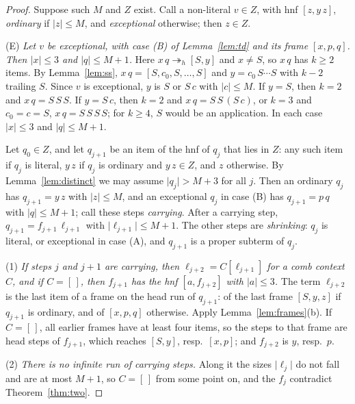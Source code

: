 \documentclass[11pt]{amsart}
\newcommand{\hred}{\twoheadrightarrow_h}
\newcommand{\sz}[1]{\lvert#1\rvert}
\newcommand{\fr}[1]{[#1]}
\begin{document}
\begin{proof}
Suppose such $M$ and $Z$ exist. Call a non-literal $v\in Z$, with hnf $\fr{z,y\,z}$, \emph{ordinary} if
$\sz z\le M$, and \emph{exceptional} otherwise; then $z\in Z$.

(E) \emph{Let $v$ be exceptional, with case (B) of Lemma~\ref{lem:td} and its frame $\fr{x,p,q}$.
Then $\sz x\le3$ and $\sz q\le M+1$.} Here $x\,q\hred\fr{S,y}$ and $x\ne S$, so $x\,q$ has $k\ge2$ items. By Lemma~\ref{lem:ss},
$x\,q=\fr{S,c_0,S,\dots,S}$ and $y=c_0\,S\cdots S$ with $k-2$ trailing $S$. Since $v$ is
exceptional, $y$ is $S$ or $S\,c$ with $\sz c\le M$. If $y=S$, then $k=2$ and $x\,q=S\,S\,S$. If $y=S\,c$, then $k=2$ and
$x\,q=S\,S\,(S\,c)$, or $k=3$ and $c_0=c=S$, $x\,q=S\,S\,S\,S$; for $k\ge4$, $S$ would be an
application. In each case $\sz x\le3$ and $\sz q\le M+1$.

Let $q_0\in Z$, and let $q_{j+1}$ be an item of the hnf of $q_j$ that lies in $Z$: any such item if
$q_j$ is literal, $y\,z$ if $q_j$ is ordinary and $y\,z\in Z$, and $z$ otherwise. By
Lemma~\ref{lem:distinct} we may assume $\sz{q_j}>M+3$ for all $j$. Then an ordinary $q_j$ has
$q_{j+1}=y\,z$ with $\sz z\le M$, and an exceptional $q_j$ in case (B) has $q_{j+1}=p\,q$ with
$\sz q\le M+1$; call these steps \emph{carrying}. After a carrying step, $q_{j+1}=f_{j+1}\,\ell_{j+1}$
with $\sz{\ell_{j+1}}\le M+1$. The other steps are \emph{shrinking}: $q_j$ is literal, or exceptional
in case (A), and $q_{j+1}$ is a proper subterm of $q_j$.

(1) \emph{If steps $j$ and $j+1$ are carrying, then $\ell_{j+2}=C[\ell_{j+1}]$ for a comb context
$C$, and if $C=[\,]$, then $f_{j+1}$ has the hnf $\fr{a,f_{j+2}}$ with $\sz a\le3$.} The term
$\ell_{j+2}$ is the last item of a frame on the head run of $q_{j+1}$: of the last frame
$\fr{S,y,z}$ if $q_{j+1}$ is ordinary, and of $\fr{x,p,q}$ otherwise. Apply
Lemma~\ref{lem:frames}(b). If $C=[\,]$, all earlier frames have at least four items, so the steps
to that frame are head steps of $f_{j+1}$, which reaches $\fr{S,y}$, resp.\ $\fr{x,p}$; and
$f_{j+2}$ is $y$, resp.\ $p$.

(2) \emph{There is no infinite run of carrying steps.} Along it the sizes $\sz{\ell_j}$ do not fall
and are at most $M+1$, so $C=[\,]$ from some point on, and the $f_j$ contradict
Theorem~\ref{thm:two}.


\end{proof}
\end{document}
